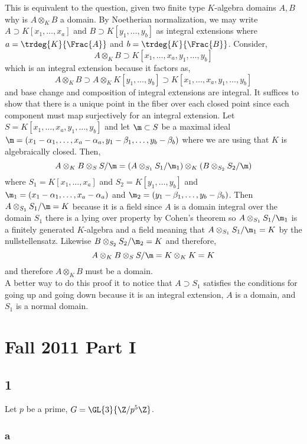 \documentclass[12pt]{article}
\begin{document}
This is equivalent to the question, given two finite type $K$-algebra domains $A,B$ why is $A \otimes_K B$ a domain. By Noetherian normalization, we may write $A \supset K[x_1, \dots, x_a]$ and $B \supset K[y_1, \dots, y_b]$ as integral extensions where $a = \trdeg{K}{\Frac{A}}$ and $b = \trdeg{K}{\Frac{B}}$. Consider,
\[ A \otimes_K B \supset K[x_1, \dots, x_a, y_1, \dots, y_b] \]
which is an integral extension because it factors as,
\[ A \otimes_K B  \supset A \otimes_K K[y_1, \dots, y_b] \supset K[x_1, \dots, x_a, y_1, \dots, y_b] \] 
and base change and composition of integral extensions are integral. It suffices to show that there is a unique point in the fiber over each closed point since each component must map surjectively for an integral extension. Let $S = K[x_1, \dots, x_a, y_1, \dots, y_b]$ and let $\m \subset S$ be a maximal ideal $\m = (x_1 - \alpha_1, \dots, x_a - \alpha_a, y_1 - \beta_1, \dots, y_b - \beta_b)$ where we are using that $K$ is algebraically closed. Then,
\[ A \otimes_K B \otimes_S  S / \m = (A \otimes_{S_1} S_1 / \m_1) \otimes_K (B \otimes_{S_2} S_2 / \m) \]
where $S_1 = K[x_1, \dots, x_a]$ and $S_2 = K[y_1, \dots, y_b]$ and $\m_1 = (x_1 - \alpha_1, \dots, x_a - \alpha_a)$ and $\m_2 = (y_1 - \beta_1, \dots, y_b - \beta_b)$. Then $A \otimes_{S_1} S_1 / \m = K$ because it is a field since $A$ is a domain integral over the domain $S_1$ there is a lying over property by Cohen's theorem so $A \otimes_{S_1} S_1 / \m_1$ is a finitely generated $K$-algebra and a field meaning that $A \otimes_{S_1} S_1 / \m_1 = K$ by the nullstellensatz. Likewise $B \otimes_{S_2} S_2 / \m_2 = K$ and therefore,
\[ A \otimes_K B \otimes_S S / \m = K \otimes_K K = K \]
and therefore $A \otimes_K B$ must be a domain.
\bigskip\\
A better way to do this proof it to notice that $A \supset S_1$ satisfies the conditions for going up and going down because it is an integral extension, $A$ is a domain, and $S_1$ is a normal domain. 

\section{Fall 2011 Part I}

\subsection{1}

Let $p$ be a prime, $G = \GL{3}{\Z / p^5 \Z}$. 

\subsubsection{a}
\end{document}
